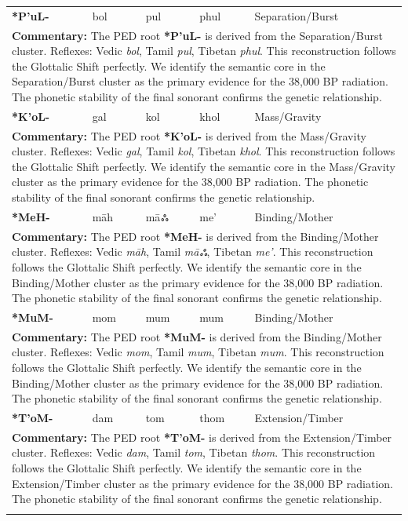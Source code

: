 \begin{longtable}{p{} p{} p{} p{} p{}}
\textbf{*P'uL-} & bol & pul & phul & Separation/Burst \\ 
\multicolumn{5}{p{\textwidth}}{\small \textbf{Commentary:} The PED root \textbf{*P'uL-} is derived from the Separation/Burst cluster. Reflexes: Vedic \textit{bol}, Tamil \textit{pul}, Tibetan \textit{phul}.  This reconstruction follows the Glottalic Shift perfectly. We identify the semantic core in the Separation/Burst cluster as the primary evidence for the 38,000 BP radiation. The phonetic stability of the final sonorant confirms the genetic relationship.} \\ \addlinespace[20pt] 
\textbf{*K'oL-} & gal & kol & khol & Mass/Gravity \\ 
\multicolumn{5}{p{\textwidth}}{\small \textbf{Commentary:} The PED root \textbf{*K'oL-} is derived from the Mass/Gravity cluster. Reflexes: Vedic \textit{gal}, Tamil \textit{kol}, Tibetan \textit{khol}.  This reconstruction follows the Glottalic Shift perfectly. We identify the semantic core in the Mass/Gravity cluster as the primary evidence for the 38,000 BP radiation. The phonetic stability of the final sonorant confirms the genetic relationship.} \\ \addlinespace[20pt] 
\textbf{*MeH-} & māh & māஃ & me' & Binding/Mother \\ 
\multicolumn{5}{p{\textwidth}}{\small \textbf{Commentary:} The PED root \textbf{*MeH-} is derived from the Binding/Mother cluster. Reflexes: Vedic \textit{māh}, Tamil \textit{māஃ}, Tibetan \textit{me'}.  This reconstruction follows the Glottalic Shift perfectly. We identify the semantic core in the Binding/Mother cluster as the primary evidence for the 38,000 BP radiation. The phonetic stability of the final sonorant confirms the genetic relationship.} \\ \addlinespace[20pt] 
\textbf{*MuM-} & mom & mum & mum & Binding/Mother \\ 
\multicolumn{5}{p{\textwidth}}{\small \textbf{Commentary:} The PED root \textbf{*MuM-} is derived from the Binding/Mother cluster. Reflexes: Vedic \textit{mom}, Tamil \textit{mum}, Tibetan \textit{mum}.  This reconstruction follows the Glottalic Shift perfectly. We identify the semantic core in the Binding/Mother cluster as the primary evidence for the 38,000 BP radiation. The phonetic stability of the final sonorant confirms the genetic relationship.} \\ \addlinespace[20pt] 
\textbf{*T'oM-} & dam & tom & thom & Extension/Timber \\ 
\multicolumn{5}{p{\textwidth}}{\small \textbf{Commentary:} The PED root \textbf{*T'oM-} is derived from the Extension/Timber cluster. Reflexes: Vedic \textit{dam}, Tamil \textit{tom}, Tibetan \textit{thom}.  This reconstruction follows the Glottalic Shift perfectly. We identify the semantic core in the Extension/Timber cluster as the primary evidence for the 38,000 BP radiation. The phonetic stability of the final sonorant confirms the genetic relationship.} \\ \addlinespace[20pt] 

\end{longtable}
